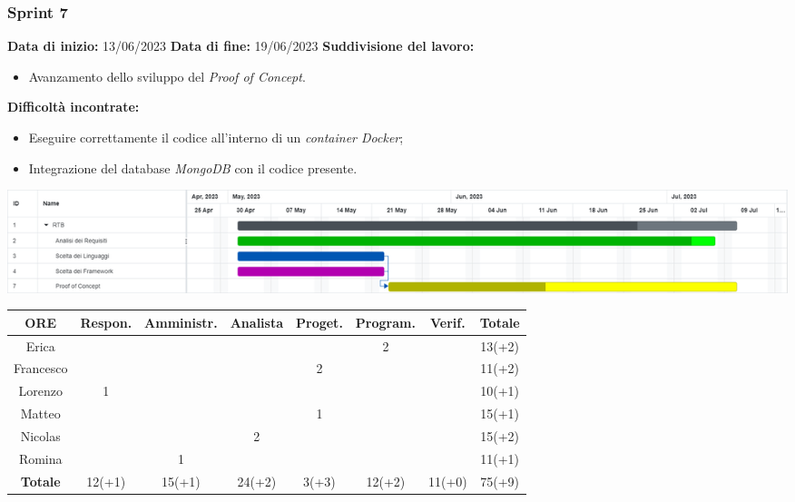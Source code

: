 \documentclass[a4paper, 12pt]{article}
\begin{document}
\subsubsection{Sprint 7}
\textbf{Data di inizio:} 13/06/2023\newline
\textbf{Data di fine:} 19/06/2023\newline
\newline
\textbf{Suddivisione del lavoro:}
\begin{itemize}
    \item Avanzamento dello sviluppo del \textit{Proof of Concept}.
\end{itemize}
\textbf{Difficoltà incontrate:}
\begin{itemize}
    \item Eseguire correttamente il codice all'interno di un \textit{container Docker};
    \item Integrazione del database \textit{MongoDB} con il codice presente.
\end{itemize}
\includegraphics[scale=0.24]{RTB_6.png}\newline
\newline
\begin{tabular}{|c|c|c|c|c|c|c|c|}
    \hline
    \textbf{ORE} & \textbf{Respon.} & \textbf{Amministr.} & \textbf{Analista} & \textbf{Proget.} & \textbf{Program.} & \textbf{Verif.} & \textbf{Totale}\\
    \hline
    Erica & & & & & 2 & & 13(+2)\\
    \hline
    Francesco & & & & 2 & & & 11(+2)\\
    \hline
    Lorenzo & 1 & & & & & & 10(+1)\\
    \hline
    Matteo & & & & 1 & & & 15(+1)\\
    \hline
    Nicolas & & & 2 & & & & 15(+2)\\
    \hline
    Romina & & 1 & & & & & 11(+1)\\
    \hline
    \textbf{Totale} & 12(+1) & 15(+1) & 24(+2) & 3(+3) & 12(+2) & 11(+0) & 75(+9)\\
    \hline
\end{tabular}\\[8pt]
\end{document}
